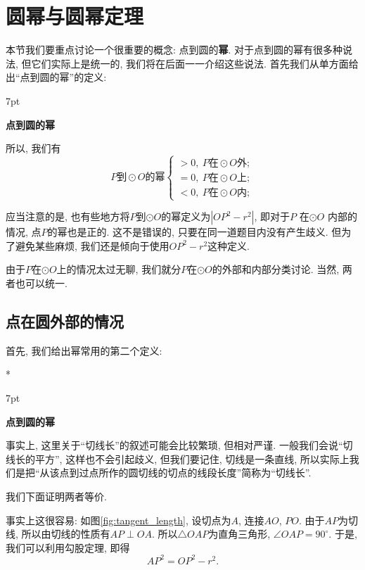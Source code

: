 \documentclass{book}
\newenvironment{theorem}{%
\def\FrameCommand{%
\hspace{1pt}%
{\color{cyan!60!blue}\vrule width 2pt}%
{\color{cyan!10}\vrule width 4pt}%
\colorbox{cyan!10}%
}%
\MakeFramed{\advance\hsize-\width\FrameRestore}%
\noindent\hspace{-4.55pt}%
\begin{adjustwidth}{}{7pt}%
\vspace{2pt}\vspace{2pt}%
}
{%
\vspace{2pt}\end{adjustwidth}\endMakeFramed%
}
\begin{document}
\section{圆幂与圆幂定理}
\begin{paracol}{2}
本节我们要重点讨论一个很重要的概念: 点到圆的\textbf{幂}. 对于点到圆的幂有很多种说法, 但它们实际上是统一的, 我们将在后面一一介绍这些说法. 首先我们从单方面给出“点到圆的幂”的定义: 
\begin{theorem}
	\textbf{点到圆的幂}
\end{theorem}
\par
所以, 我们有
\[P\text{到}\odot O\text{的幂}\begin{cases}
>0,\ P\text{在}\odot O\text{外}; \\
=0,\ P\text{在}\odot O\text{上};\\
<0,\ P\text{在}\odot O\text{内};
\end{cases}\]\par
应当注意的是, 也有些地方将$P$到$\odot O$的幂定义为$\left|OP^2-r^2\right|$, 即对于$P$ 在$\odot O$ 内部的情况, 点$P$的幂也是正的. 这不是错误的, 只要在同一道题目内没有产生歧义. 但为了避免某些麻烦, 我们还是倾向于使用$OP^2-r^2$这种定义.\par
由于$P$在$\odot O$上的情况太过无聊, 我们就分$P$在$\odot O$的外部和内部分类讨论. 当然, 两者也可以统一. 

\subsection{点在圆外部的情况}
首先, 我们给出幂常用的第二个定义: \par
\switchcolumn[0]*
\begin{theorem}
	\textbf{点到圆的幂}
\end{theorem}
\par
事实上, 这里关于“切线长”的叙述可能会比较繁琐, 但相对严谨. 一般我们会说“切线长的平方”, 这样也不会引起歧义, 但我们要记住, 切线是一条直线, 所以实际上我们是把“从该点到过点所作的圆切线的切点的线段长度”简称为“切线长”.\par
我们下面证明两者等价. \par
事实上这很容易: 如图\ref{fig:tangent_length}, 设切点为$A$, 连接$AO$, $PO$. 由于$AP$为切线, 所以由切线的性质有$AP\perp OA$. 所以$\triangle OAP$为直角三角形, $\angle OAP=90^\circ$. 于是, 我们可以利用勾股定理, 即得
\[AP^2=OP^2-r^2.\]


\end{paracol}
\end{document}
